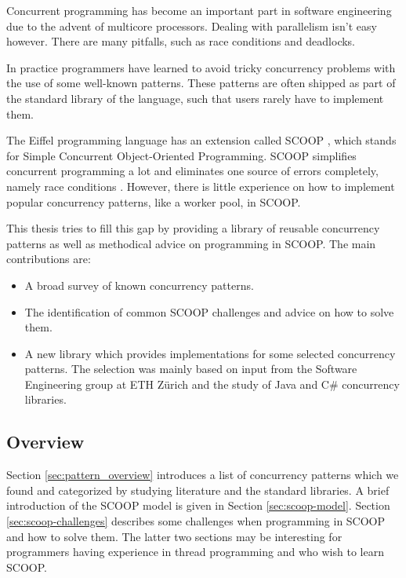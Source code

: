 \documentclass[a4paper,10pt,titlepage]{article}
\begin{document}
Concurrent programming has become an important part in software engineering due to the advent of multicore processors.
Dealing with parallelism isn't easy however.
There are many pitfalls, such as race conditions and deadlocks.

In practice programmers have learned to avoid tricky concurrency problems with the use of some well-known patterns.
These patterns are often shipped as part of the standard library of the language, such that users rarely have to implement them.

The Eiffel programming language \cite{web:ecma-eiffel}\cite{book:touchofclass} has an extension called SCOOP \cite{Nienaltowski07}\cite{web:scoop},
which stands for Simple Concurrent Object-Oriented Programming.
SCOOP simplifies concurrent programming a lot and eliminates one source of errors completely, namely race conditions \cite{Nienaltowski07}.
However, there is little experience on how to implement popular concurrency patterns, like a worker pool, in SCOOP.

This thesis tries to fill this gap by providing a library of reusable concurrency patterns as well as methodical advice on programming in SCOOP.
The main contributions are:
\begin{itemize}
 \item A broad survey of known concurrency patterns.
 \item The identification of common SCOOP challenges and advice on how to solve them.
 \item A new library which provides implementations for some selected concurrency patterns.
 The selection was mainly based on input from the Software Engineering group at ETH Zürich and the study of Java \cite{web:java-concurrency} and C\# \cite{web:ms-tpl} concurrency libraries.
\end{itemize}

\subsection{Overview}

Section \ref{sec:pattern_overview} introduces a list of concurrency patterns which we found and categorized by studying literature and the standard libraries.
A brief introduction of the SCOOP model is given in Section \ref{sec:scoop-model}.
Section \ref{sec:scoop-challenges} describes some challenges when programming in SCOOP and how to solve them.
The latter two sections may be interesting for programmers having experience in thread programming and who wish to learn SCOOP.
\end{document}
